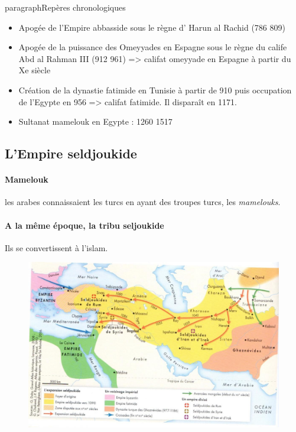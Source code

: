 paragraph{Repères chronologiques}

\begin{itemize}
    \item 
Apogée
de l’Empire abbasside sous le règne d’ Harun al Rachid (786 809)
    \item 
Apogée de la puissance des Omeyyades en Espagne sous le règne du calife
Abd al Rahman III (912 961) => califat omeyyade en Espagne à partir du
Xe siècle
    \item 
Création de la dynastie fatimide en Tunisie à partir de 910 puis occupation
de l’Egypte en 956 => califat fatimide. Il disparaît en 1171.
    \item 
Sultanat
mamelouk en Egypte : 1260 1517
\end{itemize}



\subsection{L’Empire seldjoukide}

\paragraph{Mamelouk} les arabes connaissaient les turcs en ayant des troupes turcs, les \textit{mamelouks}. 

\paragraph{A la même époque, la tribu seljoukide} Ils se convertissent à l'islam. 
 \begin{figure}[h!]
\centering
{}
\includegraphics[width=\textwidth]{HistoireIslamMediterranee/Images/EmpireSeldjoukide.jpg}
     
     \label{fig:EmpireSldjoukide}
 \end{figure}

